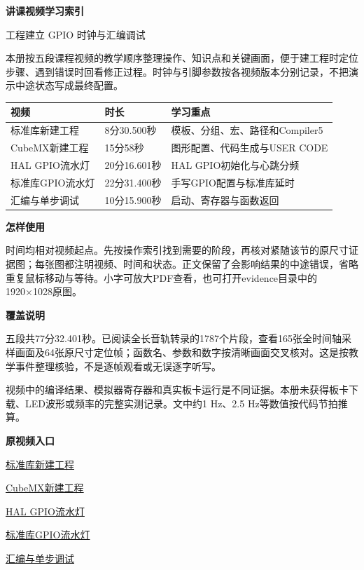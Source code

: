 \documentclass[10pt,a4paper]{article}
\newcommand{\qtitle}[1]{{\Large\bfseries #1}\par\vspace{4pt}}
\newcommand{\qsub}[1]{{\bfseries #1}\par}
\begin{document}
\qtitle{讲课视频学习索引}
{\small 工程建立 GPIO 时钟与汇编调试}\par
本册按五段课程视频的教学顺序整理操作、知识点和关键画面，便于建工程时定位步骤、遇到错误时回看修正过程。时钟与引脚参数按各视频版本分别记录，不把演示中途状态写成最终配置。

\begingroup\small
\begin{tabularx}{\linewidth}{|>{\hsize}Y|>{\hsize}Y|>{\hsize}Y|}\hline
{}
\textbf{视频} & \textbf{时长} & \textbf{学习重点} \\ \hline
标准库新建工程 & 8分30.500秒 & 模板、分组、宏、路径和Compiler5 \\ \hline
CubeMX新建工程 & 15分58秒 & 图形配置、代码生成与USER CODE \\ \hline
HAL GPIO流水灯 & 20分16.601秒 & HAL GPIO初始化与心跳分频 \\ \hline
标准库GPIO流水灯 & 22分31.400秒 & 手写GPIO配置与标准库延时 \\ \hline
汇编与单步调试 & 10分15.900秒 & 启动、寄存器与函数返回 \\ \hline
\end{tabularx}
\endgroup\par
\qsub{怎样使用}
时间均相对视频起点。先按操作索引找到需要的阶段，再核对紧随该节的原尺寸证据图；每张图都注明视频、时间和状态。正文保留了会影响结果的中途错误，省略重复鼠标移动与等待。小字可放大PDF查看，也可打开evidence目录中的1920×1028原图。

\qsub{覆盖说明}
五段共77分32.401秒。已阅读全长音轨转录的1787个片段，查看165张全时间轴采样画面及64张原尺寸定位帧；函数名、参数和数字按清晰画面交叉核对。这是按教学事件整理核验，不是逐帧观看或无误逐字听写。

视频中的编译结果、模拟器寄存器和真实板卡运行是不同证据。本册未获得板卡下载、LED波形或频率的完整实测记录。文中约1 Hz、2.5 Hz等数值按代码节拍推算。

\qsub{原视频入口}
\href{https://drive.google.com/file/d/1eZ3OqHzSFt5WKUvtYL4vOfbnIAFsdkVN/view}{标准库新建工程}\par
\href{https://drive.google.com/file/d/1QHl9C0TbRynSvDk-UhzPKI6H46yD-yIr/view}{CubeMX新建工程}\par
\href{https://drive.google.com/file/d/1WUPIvZK2o6cRg6w-QLnkPIFsBuKh2Ib1/view}{HAL GPIO流水灯}\par
\href{https://drive.google.com/file/d/1TXgXmDKF0x7eF5P2X5FxYOSMEr9YlFD1/view}{标准库GPIO流水灯}\par
\href{https://drive.google.com/file/d/1RLW3tQnyWnAlEFWp_eVrIhQIqcXAJFET/view}{汇编与单步调试}\par
\end{document}
